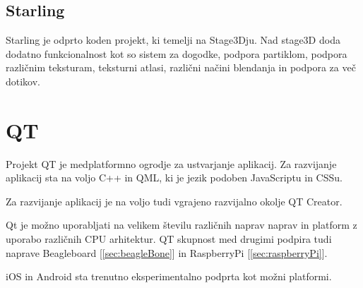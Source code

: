 \subsection{Starling}

Starling je odprto koden projekt, ki temelji na Stage3Dju. Nad stage3D doda dodatno funkcionalnost kot so sistem za dogodke, podpora partiklom, podpora različnim teksturam, teksturni atlasi, različni načini blendanja in podpora za več dotikov.

\section{QT}
\label{sec:qt}

Projekt QT je medplatformno ogrodje za ustvarjanje aplikacij. Za razvijanje aplikacij sta na voljo C++ in QML, ki je jezik podoben JavaScriptu in CSSu.

Za razvijanje aplikacij je na voljo tudi vgrajeno razvijalno okolje QT Creator.

Qt je možno uporabljati na velikem številu različnih naprav naprav in platform z uporabo različnih CPU arhitektur. QT skupnost med drugimi podpira tudi naprave Beagleboard [\ref{sec:beagleBone}] in RaspberryPi [\ref{sec:raspberryPi}]. 

iOS in Android sta trenutno eksperimentalno podprta kot možni platformi.%